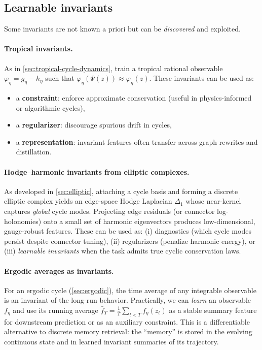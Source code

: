 \documentclass[11pt]{article}
\theoremstyle{definition}
\theoremstyle{plain}
\theoremstyle{remark}
\begin{document}
\subsection{Learnable invariants}
\label{sec:learnable-invariants}

Some invariants are not known a priori but can be \emph{discovered} and exploited.

	\paragraph{Tropical invariants.}
	As in \cref{sec:tropical-cycle-dynamics}, train a tropical rational observable $\varphi_\eta=g_\eta-h_\eta$ such that $\varphi_\eta(\Psi(z))\approx \varphi_\eta(z)$.
	These invariants can be used as:
\begin{itemize}[leftmargin=2em]
\item a \textbf{constraint}: enforce approximate conservation (useful in physics-informed or algorithmic cycles),
\item a \textbf{regularizer}: discourage spurious drift in cycles,
\item a \textbf{representation}: invariant features often transfer across graph rewrites and distillation.
\end{itemize}

\paragraph{Hodge--harmonic invariants from elliptic complexes.}
As developed in \cref{sec:elliptic}, attaching a cycle basis and forming a discrete elliptic complex yields an edge-space Hodge Laplacian $\Delta_1$ whose near-kernel captures \emph{global} cycle modes.
Projecting edge residuals (or connector log-holonomies) onto a small set of harmonic eigenvectors produces low-dimensional, gauge-robust features.
These can be used as:
(i) diagnostics (which cycle modes persist despite connector tuning),
(ii) regularizers (penalize harmonic energy), or
(iii) \emph{learnable invariants} when the task admits true cyclic conservation laws.

\paragraph{Ergodic averages as invariants.}
For an ergodic cycle (\cref{sec:ergodic}), the time average of any integrable observable is an invariant of the long-run behavior.
Practically, we can \emph{learn} an observable $f_\eta$ and use its running average
$\bar f_T=\frac1T\sum_{t<T} f_\eta(z_t)$
as a stable summary feature for downstream prediction or as an auxiliary constraint.
This is a differentiable alternative to discrete memory retrieval: the ``memory'' is stored in the evolving continuous state and in learned invariant summaries of its trajectory.
\end{document}
